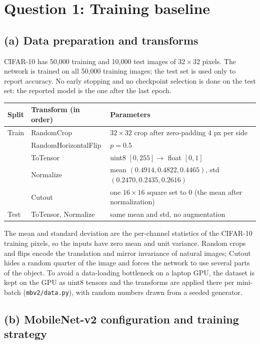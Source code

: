 \documentclass[11pt,a4paper]{article}
\begin{document}
\section*{Question 1: Training baseline}

\subsection*{(a) Data preparation and transforms}

CIFAR-10 has 50{,}000 training and 10{,}000 test images of $32\times32$ pixels. The network is trained on all 50{,}000 training images; the test set is used only to report accuracy. No early stopping and no checkpoint selection is done on the test set: the reported model is the one after the last epoch.

\begin{center}
\small
\begin{tabular}{lll}
\toprule
Split & Transform (in order) & Parameters \\
\midrule
Train & RandomCrop & $32\times32$ crop after zero-padding 4 px per side \\
      & RandomHorizontalFlip & $p=0.5$ \\
      & ToTensor & uint8 $[0,255]\to$ float $[0,1]$ \\
      & Normalize & mean $(0.4914, 0.4822, 0.4465)$, std $(0.2470, 0.2435, 0.2616)$ \\
      & Cutout & one $16\times16$ square set to 0 (the mean after normalization) \\
\midrule
Test & ToTensor, Normalize & same mean and std, no augmentation \\
\bottomrule
\end{tabular}
\end{center}

The mean and standard deviation are the per-channel statistics of the CIFAR-10 training pixels, so the inputs have zero mean and unit variance. Random crops and flips encode the translation and mirror invariance of natural images; Cutout hides a random quarter of the image and forces the network to use several parts of the object. To avoid a data-loading bottleneck on a laptop GPU, the dataset is kept on the GPU as uint8 tensors and the transforms are applied there per mini-batch (\texttt{mbv2/data.py}), with random numbers drawn from a seeded generator.

\subsection*{(b) MobileNet-v2 configuration and training strategy}
\end{document}
